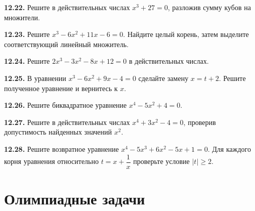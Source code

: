\noindent\begin{minipage}[t]{\linewidth}\textbf{12.22.} Решите в действительных числах \(x^3+27=0\), разложив сумму кубов на множители.\par\end{minipage}\par
\noindent\begin{minipage}[t]{\linewidth}\textbf{12.23.} Решите \(x^3-6x^2+11x-6=0\). Найдите целый корень, затем выделите соответствующий линейный множитель.\par\end{minipage}\par
\noindent\begin{minipage}[t]{\linewidth}\textbf{12.24.} Решите \(2x^3-3x^2-8x+12=0\) в действительных числах.\par\end{minipage}\par
\noindent\begin{minipage}[t]{\linewidth}\textbf{12.25.}\starmark{} В уравнении \(x^3-6x^2+9x-4=0\) сделайте замену \(x=t+2\). Решите полученное уравнение и вернитесь к \(x\).\par\end{minipage}\par
\noindent\begin{minipage}[t]{\linewidth}\textbf{12.26.} Решите биквадратное уравнение \(x^4-5x^2+4=0\).\par\end{minipage}\par
\noindent\begin{minipage}[t]{\linewidth}\textbf{12.27.} Решите в действительных числах \(x^4+3x^2-4=0\), проверив допустимость найденных значений \(x^2\).\par\end{minipage}\par
\noindent\begin{minipage}[t]{\linewidth}\textbf{12.28.}\starmark{} Решите возвратное уравнение \(x^4-5x^3+6x^2-5x+1=0\). Для каждого корня уравнения относительно \(t=x+\dfrac1x\) проверьте условие \(|t|\geq2\).\par\end{minipage}\par
\par{}\section*{Олимпиадные задачи}
